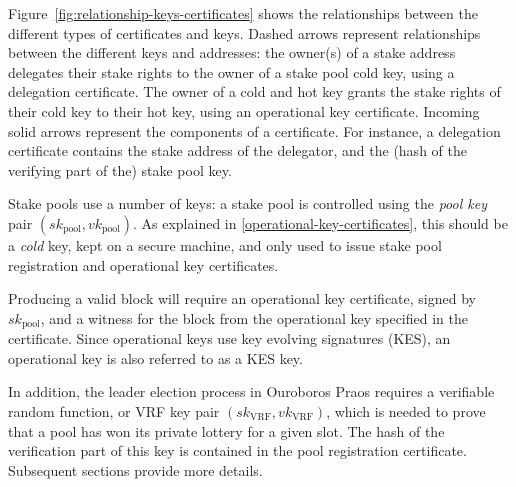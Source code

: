\documentclass[11pt,a4paper,dvipsnames,twosided]{article}
\begin{document}
Figure~\ref{fig:relationship-keys-certificates} shows the relationships between
the different types of certificates and keys.
%
Dashed arrows represent relationships between the different keys and addresses:
the owner(s) of a stake address delegates their stake rights to the owner of a
stake pool cold key, using a delegation certificate.
%
The owner of a cold and hot key grants the stake rights of their cold key to their
hot key, using an operational key certificate.
%
Incoming solid arrows represent the components of a certificate.
For instance, a delegation certificate contains the stake address of the
delegator, and the (hash of the verifying part of the) stake pool key.

Stake pools use a number of keys: a stake pool is controlled using the
\emph{pool key} pair \((sk_\text{pool}, vk_\text{pool})\). As explained in
\cref{operational-key-certificates}, this should be a \emph{cold} key, kept on a
secure machine, and only used to issue stake pool registration and operational
key certificates.

Producing a valid block will require an operational key certificate, signed by
\(sk_\text{pool}\), and a witness for the block from the operational key
specified in the certificate. Since operational keys use key evolving signatures
(KES), an operational key is also referred to as a KES key.

In addition, the leader election process in Ouroboros Praos requires a
verifiable random function, or VRF key pair \((sk_\text{VRF}, vk_\text{VRF})\),
which is needed to prove that a pool has won its private lottery for a given
slot. The hash of the verification part  of this key is
contained in the pool registration certificate.
%
Subsequent sections provide more details.
\end{document}
